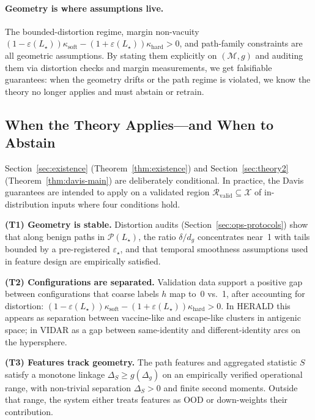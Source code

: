 \documentclass[11pt]{article}
\theoremstyle{remark}
\theoremstyle{plain}
\begin{document}
\paragraph{Geometry is where assumptions live.}
The bounded-distortion regime, margin non-vacuity
$(1-\varepsilon(L_\star))\kappa_{\mathrm{soft}} - (1+\varepsilon(L_\star))\kappa_{\mathrm{hard}} > 0$, and path-family
constraints are all geometric assumptions. By stating them explicitly on $(\mathcal{M},g)$ and
auditing them via distortion checks and margin measurements, we get falsifiable guarantees:
when the geometry drifts or the path regime is violated, we know the theory no longer applies and
must abstain or retrain.

\subsection{When the Theory Applies---and When to Abstain}

Section~\ref{sec:existence} (Theorem~\ref{thm:existence}) and
Section~\ref{sec:theory2} (Theorem~\ref{thm:davis-main}) are deliberately conditional. In practice,
the Davis guarantees are intended to apply on a validated region
$\mathcal{R}_{\mathrm{valid}} \subseteq \mathcal{X}$ of in-distribution inputs where four conditions hold.

\medskip\noindent
\textbf{(T1) Geometry is stable.} Distortion audits (Section~\ref{sec:ops-protocols}) show that along
benign paths in $\mathcal{P}(L_\star)$, the ratio $\delta/d_g$ concentrates near~1 with tails bounded
by a pre-registered $\varepsilon_\star$, and that temporal smoothness assumptions used in
feature design are empirically satisfied.

\medskip\noindent
\textbf{(T2) Configurations are separated.} Validation data support a positive gap between
configurations that coarse labels $h$ map to~0 vs.~1, after accounting for distortion:
$(1-\varepsilon(L_\star))\kappa_{\mathrm{soft}} - (1+\varepsilon(L_\star))\kappa_{\mathrm{hard}} > 0$. In HERALD this appears as separation
between vaccine-like and escape-like clusters in antigenic space; in VIDAR as a gap between
same-identity and different-identity arcs on the hypersphere.

\medskip\noindent
\textbf{(T3) Features track geometry.} The path features and aggregated statistic $S$ satisfy a
monotone linkage $\Delta_S \ge g(\Delta_g)$ on an empirically verified operational range, with
non-trivial separation $\Delta_S > 0$ and finite second moments. Outside that range, the system
either treats features as OOD or down-weights their contribution.
\end{document}
